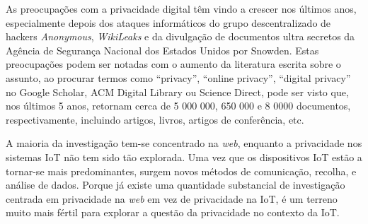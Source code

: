 \documentclass[conference]{IEEEtran}
\begin{document}

As preocupações com a privacidade digital têm vindo a crescer \cite{emami2019exploring, park2022personal, zhang2022peer}
nos últimos anos, especialmente depois dos ataques informáticos do grupo
descentralizado de hackers \textit{Anonymous}, \textit{WikiLeaks} e da divulgação
de documentos ultra secretos da Agência de Segurança Nacional dos Estados
Unidos por Snowden. Estas preocupações podem ser notadas com o aumento da
literatura escrita sobre o assunto, ao procurar termos como ``privacy'',
``online privacy'', ``digital privacy'' no Google Scholar, ACM Digital Library
ou Science Direct, pode ser visto que, nos últimos 5 anos, retornam cerca
de 5 000 000, 650 000 e 8 0000 documentos, respectivamente, incluindo artigos,
livros, artigos de conferência, etc.


A maioria da investigação tem-se concentrado na \textit{web}, enquanto a
privacidade nos sistemas IoT não tem sido tão explorada. Uma vez que os
dispositivos IoT estão a tornar-se mais predominantes, surgem novos métodos
de comunicação, recolha, e análise de dados. Porque já existe uma quantidade
substancial de investigação centrada em privacidade na \textit{web} em vez de
privacidade na IoT, é um terreno muito mais fértil para explorar a questão
da privacidade no contexto da IoT.
\end{document}
